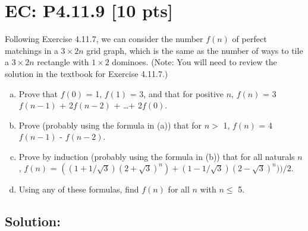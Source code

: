 \documentclass[12pt]{article}
\begin{document}
\section*{\textbf{EC: P4.11.9} [10 pts]}
 Following Exercise 4.11.7, we can consider the number $f(n)$ of perfect matchings in a $3 \times 2n$ grid graph, which is the same as the number of ways to tile a $3 \times 2n$ rectangle with $1 \times 2$ dominoes. (Note: You will need to review the solution in the textbook for Exercise 4.11.7.)
 
\begin{enumerate}[(a)]

    \item Prove that $f(0)$ = 1, $f(1)$ = 3, and that for positive $n$, $f(n)$ = 3$f(n - 1)$ + 2$f(n - 2)$ + \ldots + 2$f(0)$.

    \item Prove (probably using the formula in (a)) that for $n >$ 1, $f(n)$ = 4$f(n - 1)$ - $f(n - 2)$. 

    \item Prove by induction (probably using the formula in (b)) that for all naturals $n$, $f(n)$ = $((1 + 1/\sqrt{3})(2 + \sqrt{3})^n) + (1 - 1/\sqrt{3})(2 - \sqrt{3})^n))/2$. 

    \item Using any of these formulas, find $f(n)$ for all $n$ with $n \leq$ 5.
    
\end{enumerate}

\subsection*{\textbf{Solution:}}
\end{document}

